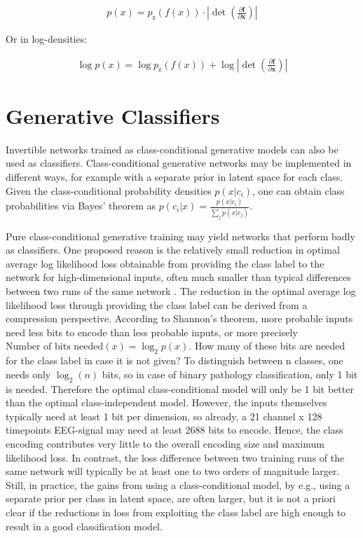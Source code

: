 \begin{align}
p(x) = p_\textrm{z}(f(x)) \cdot | \det \left( \frac{\partial \mathbf{f}}{\partial \mathbf{x}} \right)|
\end{align}

Or in log-densities:

\begin{align}
\log p(x) = \log p_\textrm{z}(f(x)) + \log |\det \left( \frac{\partial \mathbf{f}}{\partial \mathbf{x}} \right)|
\end{align}

\section{Generative Classifiers}\label{generative-classifiers}

    Invertible networks trained as class-conditional generative models can
also be used as classifiers. Class-conditional generative networks may
be implemented in different ways, for example with a separate prior in
latent space for each class. Given the class-conditional probability
densities $p(x|c_i)$, one can obtain class probabilities via Bayes'
theorem as $p(c_i|x)=\frac{p(x|c_i)}{\sum_jp(x|c_j)}$.

Pure class-conditional generative training may yield networks that
perform badly as classifiers. One proposed reason is the relatively
small reduction in optimal average log likelihood loss obtainable from
providing the class label to the network for high-dimensional inputs,
often much smaller than typical differences between two runs of the same
network \citep{DBLP:journals/corr/TheisOB15}. The reduction
in the optimal average log likelihood loss through providing the class
label can be derived from a compression perspective. According to
Shannon's theorem, more probable inputs need less bits to encode than
less probable inputs, or more precisely
$\textrm{Number of bits needed}(x) = \log_2 p(x)$. How many of these
bits are needed for the class label in case it is not given? To
distinguish between n classes, one needs only $\log_2(n)$ bits, so in
case of binary pathology classification, only 1 bit is needed. Therefore
the optimal class-conditional model will only be 1 bit better than the
optimal class-independent model. However, the inputs themselves
typically need at least 1 bit per dimension, so already, a 21 channel x
128 timepoints EEG-signal may need at least 2688 bits to encode. Hence,
the class encoding contributes very little to the overall encoding size
and maximum likelihood loss. In contrast, the loss difference between
two training runs of the same network will typically be at least one to
two orders of magnitude larger. Still, in practice, the gains from using
a class-conditional model, by e.g., using a separate prior per class in
latent space, are often larger, but it is not a priori clear if the
reductions in loss from exploiting the class label are high enough to
result in a good classification model.

